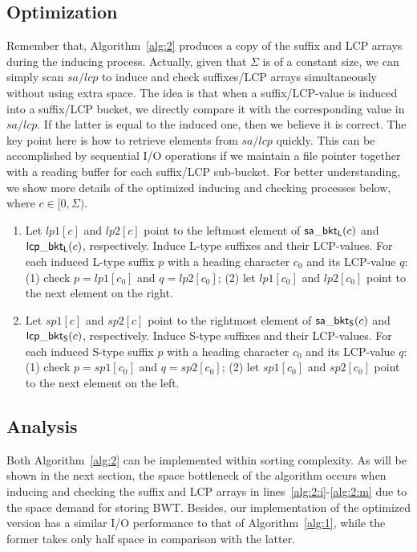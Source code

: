 \documentclass[10pt,journal,compsoc]{IEEEtran}
\begin{document}
\subsection{Optimization} \label{sec:method2:optimization}

Remember that, Algorithm~\ref{alg:2} produces a copy of the suffix and LCP arrays during the inducing process. Actually, given that $\Sigma$ is of a constant size, we can simply scan $sa/lcp$ to induce and check suffixes/LCP arrays simultaneously without using extra space. The idea is that when a suffix/LCP-value is induced into a suffix/LCP bucket, we directly compare it with the corresponding value in $sa/lcp$. If the latter is equal to the induced one, then we believe it is correct. The key point here is how to retrieve elements from $sa/lcp$ quickly. This can be accomplished by sequential I/O operations if we maintain a file pointer together with a reading buffer for each suffix/LCP sub-bucket. For better understanding, we show more details of the optimized inducing and checking processes below, where $c \in [0, \Sigma)$.

\begin{enumerate}
	\item [S1] 
	Let $lp1[c]$ and $lp2[c]$ point to the leftmost element of ${\sf sa\_bkt_L}(c)$ and ${\sf lcp\_bkt_L}(c)$, respectively. Induce L-type suffixes and their LCP-values. For each induced L-type suffix $p$ with a heading character $c_0$ and its LCP-value $q$: (1) check $p = lp1[c_0]$ and $q = lp2[c_0]$; (2) let $lp1[c_0]$ and $lp2[c_0]$ point to the next element on the right.
	\item [S2] 
	Let $sp1[c]$ and $sp2[c]$ point to the rightmost element of ${\sf sa\_bkt_S}(c)$ and ${\sf lcp\_bkt_S}(c)$, respectively. Induce S-type suffixes and their LCP-values. For each induced S-type suffix $p$ with a heading character $c_0$ and its LCP-value $q$: (1) check $p = sp1[c_0]$ and $q = sp2[c_0]$; (2) let $sp1[c_0]$ and $sp2[c_0]$ point to the next element on the left.
\end{enumerate}

\subsection{Analysis} \label{sec:method2:analysis}

Both Algorithm~\ref{alg:2} can be implemented within sorting complexity. As will be shown in the next section, the space bottleneck of the algorithm occurs when inducing and checking the suffix and LCP arrays in lines~\ref{alg:2:i}-\ref{alg:2:m} due to the space demand for storing BWT. Besides, our implementation of the optimized version has a similar I/O performance to that of Algorithm~\ref{alg:1}, while the former takes only half space in comparison with the latter.
\end{document}
